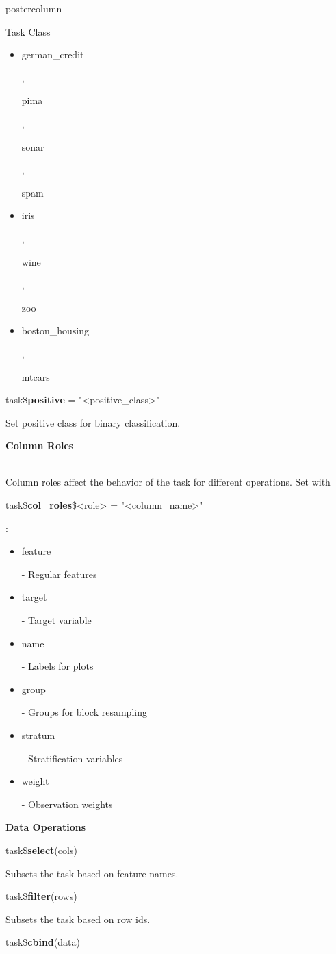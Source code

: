\documentclass{beamer}
\newcommand{\codeinline}[1]{\begin{codeboxinline}#1\end{codeboxinline}}
\newcommand{\sectionheading}[1]{{\color{mlrblue}\large\raggedright\textbf{#1}}\vspace{1em}}
\begin{document}
\begin{frame}[fragile]{}
\begin{columns}
\begin{column}{.245\textwidth}
\begin{beamercolorbox}[center]{postercolumn}
\begin{minipage}{.98\textwidth}
{\begin{myblock}{Task Class}
\begin{itemize}
								\item \codeinline{german\_credit}, \codeinline{pima}, \codeinline{sonar},
								\codeinline{spam}
								\item \codeinline{iris}, \codeinline{wine}, \codeinline{zoo}
								\item \codeinline{boston\_housing}, \codeinline{mtcars}
                            \end{itemize}
							\vspace{1em}
							\begin{codebox}
								task\$\textbf{positive} = "<positive\_class>"
							\end{codebox}
							Set positive class for binary classification.
							\vspace{1em}
							\\
                            \sectionheading{Column Roles}
                            \\
							Column roles affect the behavior of the task for different operations. Set with \codeinline{task\$\textbf{col\_roles}\$<role> = "<column\_name>"}:
							\\
							\begin{itemize}
								\item \codeinline{feature} - Regular features
								\item \codeinline{target} - Target variable
								\item \codeinline{name} - Labels for plots
								\item \codeinline{group} -  Groups for block resampling
								\item \codeinline{stratum} - Stratification variables
								\item \codeinline{weight} - Observation weights
							\end{itemize}
							\vspace{1em}
                            \sectionheading{Data Operations}
                            \begin{codebox}
								task\$\textbf{select}(cols)
							\end{codebox}
							Subsets the task based on feature names.
							\\
							\begin{codebox}
								task\$\textbf{filter}(rows)
							\end{codebox}
							Subsets the task based on row ids.
							\\
							\begin{codebox}
								task\$\textbf{cbind}(data)

\end{codebox}
\end{myblock}}
\end{minipage}
\end{beamercolorbox}
\end{column}
\end{columns}
\end{frame}
\end{document}
